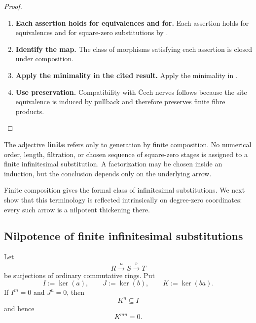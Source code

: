 \begin{proof}
\leavevmode
\begin{enumerate}[label=\textup{(\arabic*)}]
    \item \textbf{Each assertion holds for equivalences and for.}
    Each assertion holds for equivalences and for square-zero substitutions by
    .

    \item \textbf{Identify the map.}
    The class of morphisms satisfying each assertion is closed under composition.

    \item \textbf{Apply the minimality in the cited result.}
    Apply the minimality in .

    \item \textbf{Use preservation.}
    Compatibility with \v{C}ech nerves follows because the site equivalence is induced by
    pullback and therefore preserves finite fibre products.
\end{enumerate}
\end{proof}

\begin{remark}
\label{rem:finite-infinitesimal-no-order}
The adjective \textbf{finite} refers only to generation by finite composition.
No numerical order, length, filtration, or chosen sequence of square-zero
stages is assigned to a finite infinitesimal substitution. A factorization
may be chosen inside an induction, but the conclusion depends only on the
underlying arrow.
\end{remark}
Finite composition gives the formal class of infinitesimal substitutions. We
next show that this terminology is reflected intrinsically on degree-zero
coordinates: every such arrow is a nilpotent thickening there.

\subsection{Nilpotence of finite infinitesimal substitutions}

\begin{lemma}
\label{lem:nilpotence-composite-surjections}
Let
\[
    R\xrightarrow{a}S\xrightarrow{b}T
\]
be surjections of ordinary commutative rings. Put
\[
    I:=\ker(a),\qquad J:=\ker(b),\qquad K:=\ker(ba).
\]
If \(I^m=0\) and \(J^n=0\), then
\[
    K^n\subseteq I
\]
and hence
\[
    K^{mn}=0.
\]
\end{lemma}


